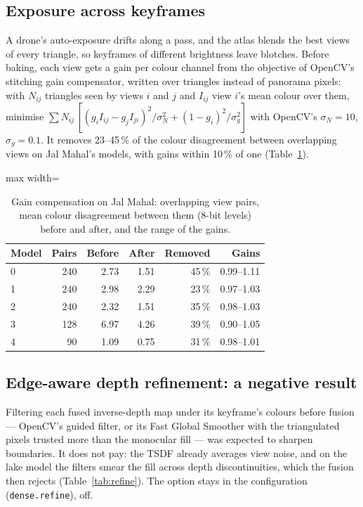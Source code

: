 \subsection{Exposure across keyframes}\label{sec:gain}
A drone's auto-exposure drifts along a pass, and the atlas blends the best views of every triangle, so keyframes of different brightness leave blotches. Before baking, each view gets a gain per colour channel from the objective of OpenCV's stitching gain compensator, written over triangles instead of panorama pixels: with $N_{ij}$ triangles seen by views $i$ and $j$ and $I_{ij}$ view $i$'s mean colour over them, minimise $\sum N_{ij}\,[(g_iI_{ij}-g_jI_{ji})^2/\sigma_N^2 + (1-g_i)^2/\sigma_g^2]$ with OpenCV's $\sigma_N=10$, $\sigma_g=0.1$. It removes 23--45\,\% of the colour disagreement between overlapping views on Jal Mahal's models, with gains within 10\,\% of one (Table~\ref{tab:gain}).

\begin{table}[htbp]
\centering\small
\caption{Gain compensation on Jal Mahal: overlapping view pairs, mean colour disagreement between them (8-bit levels) before and after, and the range of the gains.}\label{tab:gain}
\begin{adjustbox}{max width=\linewidth}
\begin{tabular}{lrrrrr}
\toprule
Model & Pairs & Before & After & Removed & Gains \\
\midrule
0 & 240 & 2.73 & 1.51 & 45\,\% & 0.99--1.11 \\
1 & 240 & 2.98 & 2.29 & 23\,\% & 0.97--1.03 \\
2 & 240 & 2.32 & 1.51 & 35\,\% & 0.98--1.03 \\
3 & 128 & 6.97 & 4.26 & 39\,\% & 0.90--1.05 \\
4 & 90 & 1.09 & 0.75 & 31\,\% & 0.98--1.01 \\
\bottomrule
\end{tabular}
\end{adjustbox}
\end{table}

\subsection{Edge-aware depth refinement: a negative result}\label{sec:refine}
Filtering each fused inverse-depth map under its keyframe's colours before fusion --- OpenCV's guided filter, or its Fast Global Smoother with the triangulated pixels trusted more than the monocular fill --- was expected to sharpen boundaries. It does not pay: the TSDF already averages view noise, and on the lake model the filters smear the fill across depth discontinuities, which the fusion then rejects (Table~\ref{tab:refine}). The option stays in the configuration (\texttt{dense.refine}), off.

